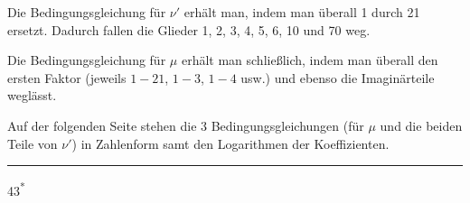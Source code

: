 Die Bedingungsgleichung für \(\nu'\) erhält man, indem man überall 1 durch 21 ersetzt. Dadurch fallen die Glieder 1, 2, 3, 4, 5, 6, 10 und 70 weg.

Die Bedingungsgleichung für \(\mu\) erhält man schließlich, indem man überall den ersten Faktor (jeweils \(1-21\), \(1-3\), \(1-4\) usw.) und ebenso die Imaginärteile weglässt.

Auf der folgenden Seite stehen die 3 Bedingungsgleichungen (für \(\mu\) und die beiden Teile von \(\nu'\)) in Zahlenform samt den Logarithmen der Koeffizienten.
\begin{center}\rule{.18\linewidth}{.4pt}\end{center}
\par\vfill\noindent\hfill43\textsuperscript{*}
